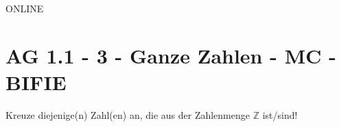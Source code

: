 ONLINE
\section{AG 1.1 - 3 - Ganze Zahlen - MC - BIFIE}

\begin{beispiel}[AG 1.1]{1} %
Kreuze diejenige(n) Zahl(en) an, die aus der Zahlenmenge $\mathbb{Z}$ ist/sind!
\end{beispiel}
